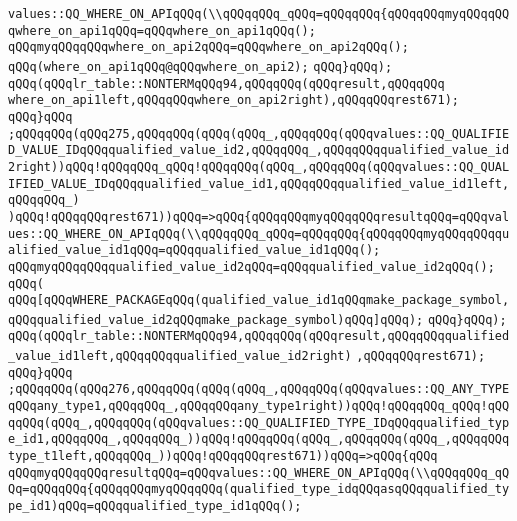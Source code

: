 \verb|values::QQ_WHERE_ON_APIqQQq(\\qQQqqQQq_qQQq=qQQqqQQq{qQQqqQQqmyqQQqqQQqwhere_on_api1qQQq=qQQqwhere_on_api1qQQq();|\newline
\verb|qQQqmyqQQqqQQqwhere_on_api2qQQq=qQQqwhere_on_api2qQQq();|\newline
\verb|qQQq(where_on_api1qQQq@qQQqwhere_on_api2);|\newline
\verb|qQQq}qQQq);|\newline
\verb|qQQq(qQQqlr_table::NONTERMqQQq94,qQQqqQQq(qQQqresult,qQQqqQQq|\newline
\verb|where_on_api1left,qQQqqQQqwhere_on_api2right),qQQqqQQqrest671);|\newline
\verb|qQQq}qQQq|\newline
\verb|;qQQqqQQq(qQQq275,qQQqqQQq(qQQq(qQQq_,qQQqqQQq(qQQqvalues::QQ_QUALIFIED_VALUE_IDqQQqqualified_value_id2,qQQqqQQq_,qQQqqQQqqualified_value_id2right))qQQq!qQQqqQQq_qQQq!qQQqqQQq(qQQq_,qQQqqQQq(qQQqvalues::QQ_QUALIFIED_VALUE_IDqQQqqualified_value_id1,qQQqqQQqqualified_value_id1left,qQQqqQQq_)|\newline
\verb|)qQQq!qQQqqQQqrest671))qQQq=>qQQq{qQQqqQQqmyqQQqqQQqresultqQQq=qQQqvalues::QQ_WHERE_ON_APIqQQq(\\qQQqqQQq_qQQq=qQQqqQQq{qQQqqQQqmyqQQqqQQqqualified_value_id1qQQq=qQQqqualified_value_id1qQQq();|\newline
\verb|qQQqmyqQQqqQQqqualified_value_id2qQQq=qQQqqualified_value_id2qQQq();|\newline
\verb|qQQq(|\newline
\verb|qQQq[qQQqWHERE_PACKAGEqQQq(qualified_value_id1qQQqmake_package_symbol,qQQqqualified_value_id2qQQqmake_package_symbol)qQQq]qQQq);|\newline
\verb|qQQq}qQQq);|\newline
\verb|qQQq(qQQqlr_table::NONTERMqQQq94,qQQqqQQq(qQQqresult,qQQqqQQqqualified_value_id1left,qQQqqQQqqualified_value_id2right)|\newline
\verb|,qQQqqQQqrest671);|\newline
\verb|qQQq}qQQq|\newline
\verb|;qQQqqQQq(qQQq276,qQQqqQQq(qQQq(qQQq_,qQQqqQQq(qQQqvalues::QQ_ANY_TYPEqQQqany_type1,qQQqqQQq_,qQQqqQQqany_type1right))qQQq!qQQqqQQq_qQQq!qQQqqQQq(qQQq_,qQQqqQQq(qQQqvalues::QQ_QUALIFIED_TYPE_IDqQQqqualified_type_id1,qQQqqQQq_,qQQqqQQq_))qQQq!qQQqqQQq(qQQq_,qQQqqQQq(qQQq_,qQQqqQQqtype_t1left,qQQqqQQq_))qQQq!qQQqqQQqrest671))qQQq=>qQQq{qQQq|\newline
\verb|qQQqmyqQQqqQQqresultqQQq=qQQqvalues::QQ_WHERE_ON_APIqQQq(\\qQQqqQQq_qQQq=qQQqqQQq{qQQqqQQqmyqQQqqQQq(qualified_type_idqQQqasqQQqqualified_type_id1)qQQq=qQQqqualified_type_id1qQQq();|\newline
